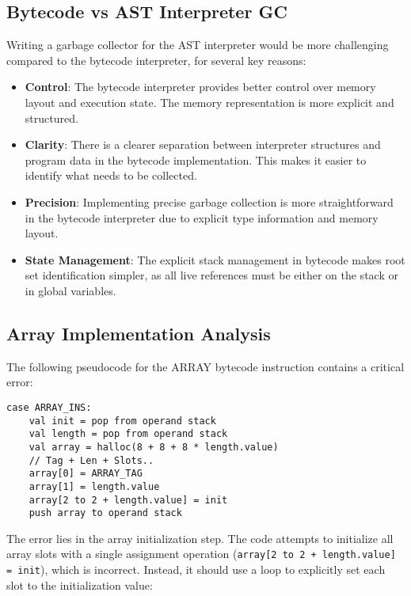 \documentclass[12pt, a4paper]{article}
\begin{document}
\subsection{Bytecode vs AST Interpreter GC}
Writing a garbage collector for the AST interpreter would be more challenging compared to the bytecode interpreter, for several key reasons:

\begin{itemize}
\item \textbf{Control}: The bytecode interpreter provides better control over memory layout and execution state. The memory representation is more explicit and structured.

\item \textbf{Clarity}: There is a clearer separation between interpreter structures and program data in the bytecode implementation. This makes it easier to identify what needs to be collected.

\item \textbf{Precision}: Implementing precise garbage collection is more straightforward in the bytecode interpreter due to explicit type information and memory layout.

\item \textbf{State Management}: The explicit stack management in bytecode makes root set identification simpler, as all live references must be either on the stack or in global variables.
\end{itemize}

\subsection{Array Implementation Analysis}
The following pseudocode for the ARRAY bytecode instruction contains a critical error:

\begin{verbatim}
case ARRAY_INS:
    val init = pop from operand stack
    val length = pop from operand stack
    val array = halloc(8 + 8 + 8 * length.value) 
    // Tag + Len + Slots..
    array[0] = ARRAY_TAG
    array[1] = length.value
    array[2 to 2 + length.value] = init
    push array to operand stack
\end{verbatim}

The error lies in the array initialization step. The code attempts to initialize all array slots with a single assignment operation (\texttt{array[2 to 2 + length.value] = init}), which is incorrect. Instead, it should use a loop to explicitly set each slot to the initialization value:
\end{document}
